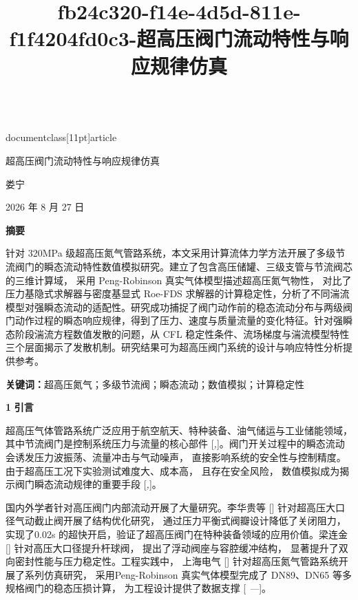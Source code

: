 \\documentclass[11pt]{article}
\begin{document}
\title{fb24c320-f14e-4d5d-811e-f1f4204fd0c3-超高压阀门流动特性与响应规律仿真}\maketitle\n
\par
\par
\par
超高压阀门流动特性与响应规律仿真\par

\par
娄宁\par

2026 年 8 月 27  日\par

\par
\par
\textbf{摘要}\par

针对 320MPa 级超高压氮气管路系统，本文采用计算流体力学方法开展了多级节流阀门的瞬态流动特性数值模拟研究。建立了包含高压储罐、三级支管与节流阀芯的三维计算域， 采用 Peng-Robinson 真实气体模型描述超高压氮气物性， 对比了压力基隐式求解器与密度基显式 Roe-FDS 求解器的计算稳定性，分析了不同湍流模型对强瞬态流动的适配性。研究成功捕捉了阀门动作前的稳态流动分布与两级阀门动作过程的瞬态响应规律，得到了压力、速度与质量流量的变化特征。针对强瞬态阶段湍流方程数值发散的问题，从 CFL 稳定性条件、流场梯度与湍流模型特性三个层面揭示了发散机制。研究结果可为超高压阀门系统的设计与响应特性分析提供参考。\par

\textbf{关键词：}超高压氮气；多级节流阀；瞬态流动；数值模拟；计算稳定性\par

\par
\par
\par
\textbf{1}\textbf{    }\textbf{引言}\par

超高压气体管路系统广泛应用于航空航天、特种装备、油气储运与工业储能领域，其中节流阀门是控制系统压力与流量的核心部件 [\textit{,}]。阀门开关过程中的瞬态流动会诱发压力波振荡、流量冲击与气动噪声， 直接影响系统的安全性与控制精度。由于超高压工况下实验测试难度大、成本高， 且存在安全风险， 数值模拟成为揭示阀门瞬态流动规律的重要手段 [\textit{,}]。\par

国内外学者针对高压阀门内部流动开展了大量研究。李华贵等 [\cite{3b7abd61_5375_480a_b603_09b3c731c43f_01_DN89切断阀压损稳态仿真阶段性报告}]  针对超高压大口径气动截止阀开展了结构优化研究， 通过压力平衡式阀瓣设计降低了关闭阻力， 实现了0.02s 的超快开启，验证了超高压阀门在特种装备领域的应用价值。梁连金 [\cite{88d32ae0_631e_44d3_8492_0fcfdf192585_超高压阀门流动特性与响应规律仿真}]  针对高压大口径提升杆球阀， 提出了浮动阀座与容腔缓冲结构， 显著提升了双向密封性能与压力稳定性。工程实践中， 上海电气 [\cite{99fa1095_b0df_4b4c_be5d_f90ea8582a3c_超高压阀门流动特性与响应规律仿真}]  针对超高压氮气管路系统开展了系列仿真研究， 采用Peng-Robinson 真实气体模型完成了 DN89、DN65 等多规格阀门的稳态压损计算， 为工程设计提供了数据支撑 [ \textit{—}]。\par
\end{document}
